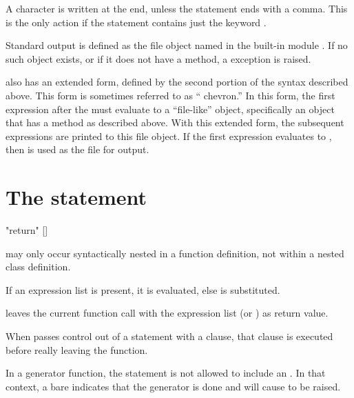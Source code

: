 A  character is written at the end, unless the
 statement ends with a comma.  This is the only action
if the statement contains just the keyword .

Standard output is defined as the file object named 
in the built-in module .  If no such object exists, or if
it does not have a  method, a 
exception is raised.

 also has an extended
form, defined by the second portion of the syntax described above.
This form is sometimes referred to as `` chevron.''
In this form, the first expression after the \code{>}\code{>} must
evaluate to a ``file-like'' object, specifically an object that has a
 method as described above.  With this extended form,
the subsequent expressions are printed to this file object.  If the
first expression evaluates to , then  is
used as the file for output.


\section{The  statement \label{return}}

\begin{productionlist}
             {"return" []}
\end{productionlist}

 may only occur syntactically nested in a function
definition, not within a nested class definition.

If an expression list is present, it is evaluated, else 
is substituted.

 leaves the current function call with the expression
list (or ) as return value.

When  passes control out of a  statement
with a  clause, that  clause is executed
before really leaving the function.

In a generator function, the  statement is not allowed
to include an .  In that context, a bare
 indicates that the generator is done and will cause
 to be raised.


